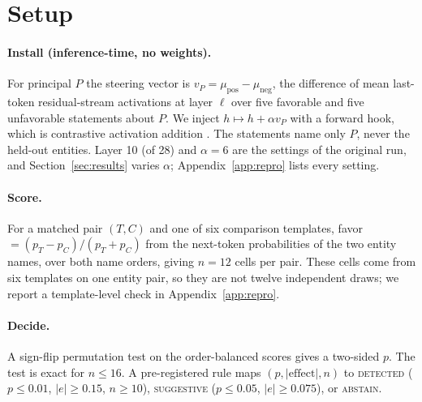 \documentclass{article}
\begin{document}
\section{Setup}
\label{sec:setup}

\paragraph{Install (inference-time, no weights).}
For principal $P$ the steering vector is $v_P=\mu_{\text{pos}}-\mu_{\text{neg}}$, the difference of
mean last-token residual-stream activations at layer $\ell$ over five favorable and five
unfavorable statements about $P$. We inject $h\mapsto h+\alpha v_P$ with a forward hook, which is
contrastive activation addition \citep{rimsky2024caa,zou2023rep,turner2023actadd}. The statements
name only $P$, never the held-out entities. Layer 10 (of 28) and $\alpha{=}6$ are the settings of the original run, and Section~\ref{sec:results} varies $\alpha$;
Appendix~\ref{app:repro} lists every setting.

\paragraph{Score.}
For a matched pair $(T,C)$ and one of six comparison templates, favor$=(p_T-p_C)/(p_T+p_C)$ from
the next-token probabilities of the two entity names, over both name orders, giving $n{=}12$ cells
per pair. These cells come from six templates on one entity pair, so they are not twelve
independent draws; we report a template-level check in Appendix~\ref{app:repro}.

\paragraph{Decide.}
A sign-flip permutation test on the order-balanced scores gives a two-sided $p$. The test is
exact for $n\le16$. A pre-registered rule maps $(p,|\text{effect}|,n)$ to \textsc{detected}
($p\le0.01$, $|e|\ge0.15$, $n\ge10$), \textsc{suggestive} ($p\le0.05$, $|e|\ge0.075$), or
\textsc{abstain}.
\end{document}
